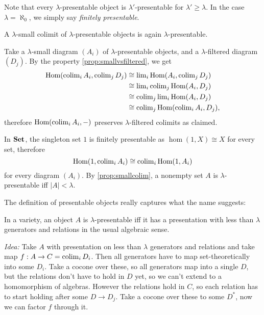 Note that every $\lambda$-presentable object is $\lambda'$-presentable for $\lambda' \geq \lambda$. In the case $\lambda=\aleph_0$, we simply say \emph{finitely presentable}. \\

\begin{Lemma}\label{prop:smallcolim} A $\lambda$-small colimit of $\lambda$-presentable objects is again $\lambda$-presentable.
\end{Lemma}
\begin{Proof}
Take a $\lambda$-small diagram $(A_i)$ of $\lambda$-presentable objects, and a $\lambda$-filtered diagram $(D_j)$. By the property \ref{prop:smallvsfiltered}, we get
\begin{align*}
\textrm{Hom}(\operatorname{colim}_i A_i, \operatorname{colim}_j D_j) &\cong \operatorname{lim}_i \textrm{Hom}(A_i, \operatorname{colim}_j D_j) \\
&\cong \operatorname{lim}_i \operatorname{colim}_j \textrm{Hom}(A_i, D_j) \\
&\cong \operatorname{colim}_j \operatorname{lim}_i \textrm{Hom}(A_i, D_j) \\
&\cong \operatorname{colim}_j \textrm{Hom}(\operatorname{colim}_i A_i, D_j),
\end{align*}
therefore $\textrm{Hom}(\operatorname{colim}_i A_i, -)$ preserves $\lambda$-filtered colimits as claimed.
\end{Proof}

\begin{Example}
In $\mathbf{Set}$, the singleton set $1$ is finitely presentable as $\hom(1,X) \cong X$ for every set, therefore
\[ \textrm{Hom}(1,\operatorname{colim}_i A_i) \cong \operatorname{colim}_i \textrm{Hom}(1,A_i) \]
for every diagram $(A_i)$. By \ref{prop:smallcolim}, a nonempty set $A$ is $\lambda$-presentable iff $|A| < \lambda$.
\end{Example}

The definition of presentable objects really captures what the name suggests: 

\begin{Proposition}\label{prop:varietypresentable} In a variety, an object $A$ is $\lambda$-presentable iff it has a presentation with less than $\lambda$ generators and relations in the usual algebraic sense.
\end{Proposition}
\textit{Idea: } Take $A$ with presentation on less than $\lambda$ generators and relations and take map $f : A \to C = \operatorname{colim}_i D_i$. Then all generators have to map set-theoretically into some $D_i$. Take a cocone over these, so all generators map into a single $D$, but the relations don't have to hold in $D$ yet, so we can't extend to a homomorphism of algebras. However the relations hold in $C$, so each relation has to start holding after some $D \to D_j$. Take a cocone over these to some $D^*$, now we can factor $f$ through it. \\

